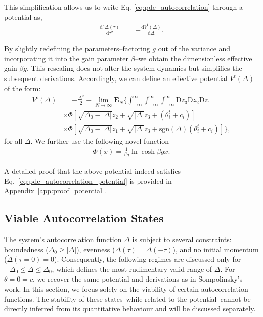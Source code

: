 \documentclass[reprint,amsmath,amssymb,aps]{revtex4-2}
\begin{document}
This simplification allows us to write Eq. \eqref{eq:pde_autocorrelation} through a potential as, 
\begin{align}
\label{eq:pde_autocorrelation_potential}
    \frac{\mathrm{d}^2\Delta(\tau)}{\mathrm{d}\tau^2} &= - \frac{\mathrm{d}V^t(\Delta)}{\mathrm{d}\Delta}.
\end{align}

By slightly redefining the parameters--factoring \(g\) out of the variance and incorporating it into the gain parameter \(\beta\)--we obtain the dimensionless effective gain \(\beta g\). This rescaling does not alter the system dynamics but simplifies the subsequent derivations. Accordingly, we can define an effective potential \(V^t(\Delta)\) of the form:
\begin{align}
\label{eq:effective_potential}
    V^t(\Delta)
    &=
    -\frac{\Delta^2}{2}+ 
    \lim_{N\to\infty} \mathbf{E}_{N} \Bigg\{
    \int_{-\infty}^{\infty}
    \int_{-\infty}^{\infty}
    \int_{-\infty}^{\infty}
    \mathrm{D}z_3
    \mathrm{D}z_2
    \mathrm{D}z_1
    \nonumber \\
    &\times
    \Phi\left[ \sqrt{\Delta_0 - |\Delta|} z_2 + \sqrt{|\Delta|}z_3 + (\theta_i^t + c_i)\right] \nonumber \\
    &\times
    \Phi\left[ \sqrt{\Delta_0 - |\Delta|} z_1 + \sqrt{|\Delta|}z_3 + \mathrm{sgn}(\Delta) (\theta_i^t + c_i)\right]\Bigg\},
\end{align}
for all $\Delta$. We further use the following novel function  
\begin{align*}
    \Phi(x) = \frac{1}{\beta g} \ln{\cosh{\beta g x}}.
\end{align*}

A detailed proof that the above potential indeed satisfies Eq.~\eqref{eq:pde_autocorrelation_potential} is provided in Appendix~\ref{app:proof_potential}.

\subsection{Viable Autocorrelation States}\label{sec:auto_regimes}

The system's autocorrelation function $\Delta$ is subject to several constraints: boundedness ($\Delta_0 \geq |\Delta|$), evenness ($\Delta(\tau) = \Delta(-\tau)$), and no initial momentum ($\dot{\Delta}(\tau=0) = 0$). Consequently, the following regimes are discussed only for $-\Delta_0 \leq \Delta \leq \Delta_0$, which defines the most rudimentary valid range of $\Delta$. For $\theta = 0 = c$, we recover the same potential and derivations as in Sompolinsky's work. In this section, we focus solely on the viability of certain autocorrelation functions. The stability of these states--while related to the potential--cannot be directly inferred from its quantitative behaviour and will be discussed separately.  
\end{document}

